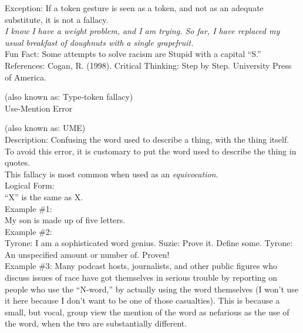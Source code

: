 \documentclass[a4paper,12pt,single,pdftex]{scrbook}
\begin{document}
      
        Exception: If a token gesture is seen as a token, and not as an adequate substitute, it is not a fallacy.
      \\

      
        {\em I know I have a weight problem, and I am trying.  So far, I have replaced my usual breakfast of doughnuts with a single grapefruit.}
      \\

      
        Fun Fact: Some attempts to solve racism are Stupid with a capital “S.”
      \\

    
    References: Cogan, R. (1998). Critical Thinking: Step by Step. University Press of America.
  
    
      (also known as: Type-token fallacy)
    \\

  

Use-Mention Error
    
      (also known as: UME)
    \\

  
    
      Description:  Confusing the word used to describe a thing, with the thing itself.  To avoid this error, it is customary to put the word used to describe the thing in quotes.
    \\

    
      This fallacy is most common when used as an {\it equivocation}.
    \\

    
      Logical Form:
    \\

    
      “X” is the same as X.
    \\

    
      Example \#1:
    \\

    
      My son is made up of five letters.
    \\

    
      Example \#2:
    \\

    
      Tyrone: I am a sophisticated word genius. \newline
Suzie: Prove it. Define some. \newline
Tyrone: An unspecified amount or number of. Proven!
    \\

    
      Example \#3: Many podcast hosts, journalists, and other public figures who discuss issues of race have got themselves in serious trouble by reporting on people who use the “N-word,” by actually using the word themselves (I won’t use it here because I don’t want to be one of those casualties). This is because a small, but vocal, group view the mention of the word as nefarious as the use of the word, when the two are substantially different.
    \\
\end{document}
